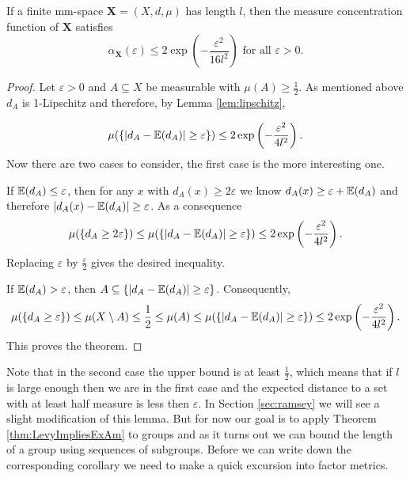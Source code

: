 
\begin{theorem}\label{thm:measureConcetration}
If a finite mm-space $\boldsymbol{X}=(X,d,\mu)$ has length $l$, then the measure concentration function of $\boldsymbol X$ satisfies
\[\alpha_{\boldsymbol{X}}(\varepsilon)\leq 2\exp\left(-\frac{\varepsilon^2}{16l^2}\right)\text{ for all $\varepsilon>0$}.\]
\end{theorem}
\begin{proof}
Let $\varepsilon>0$ and $A\subseteq X$ be measurable with $\mu(A)\geq\frac{1}{2}$. As mentioned above $d_A$ is 1-Lipschitz and therefore, by Lemma \ref{lem:lipschitz},

\[\mu(\{|d_A-\mathbb{E}(d_A)|\geq\varepsilon\})\leq 2\exp\left(-\frac{\varepsilon^2}{4l^2}\right).\]
Now there are two cases to consider, the first case is the more interesting one.

If $\mathbb{E}(d_A)\leq\varepsilon$, then for any $x$ with $d_A(x)\geq2\varepsilon$ we know $d_A(x)\geq \varepsilon+\mathbb{E}(d_A)$ and therefore $|d_A(x)-\mathbb{E}(d_A)|\geq \varepsilon$. As a consequence %
\[\mu(\{d_A\geq2\varepsilon\})\leq \mu(\{|d_A-\mathbb{E}(d_A)|\geq\varepsilon\})\leq2\exp\left(-\frac{\varepsilon^2}{4l^2}\right) .\]
Replacing $\varepsilon$ by $\frac{\varepsilon}{2}$ gives the desired inequality.

If $\mathbb{E}(d_A)>\varepsilon$, then $A\subseteq \{|d_A-\mathbb{E}(d_A)|\geq\varepsilon\}$. Consequently,
\[\mu(\{d_A\geq\varepsilon\})\leq \mu(X\setminus A)\leq \frac{1}{2}\leq \mu(A)\leq \mu(\{|d_A-\mathbb{E}(d_A)|\geq\varepsilon\})\leq 2\exp\left(-\frac{\varepsilon^2}{4l^2}\right).\]
This proves the theorem.
\end{proof}
Note that in the second case the upper bound is at least $\frac{1}{2}$, which means that if $l$ is large enough then we are in the first case and the expected distance to a set with at least half measure is less then $\varepsilon$. In Section \ref{sec:ramsey} we will see a slight modification of this lemma.
But for now our goal is to apply Theorem \ref{thm:LevyImpliesExAm} to groups and as it turns out we can bound the length of a group using sequences of subgroups. Before we can write down the corresponding corollary we need to make a quick excursion into factor metrics. 

